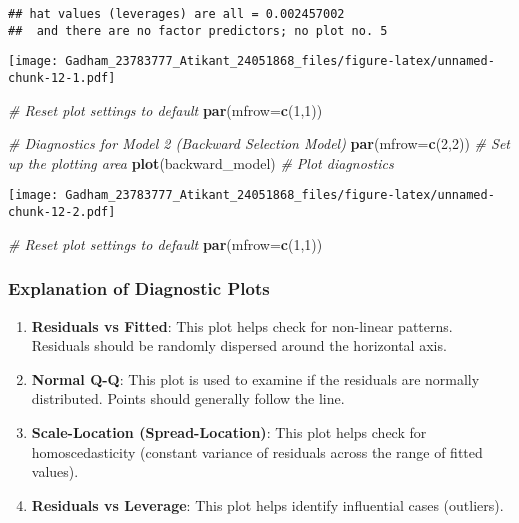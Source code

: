 \documentclass[
]{article}
\newenvironment{Shaded}{\begin{snugshade}}{\end{snugshade}}
\newcommand{\AttributeTok}[1]{\textcolor[rgb]{0.13,0.29,0.53}{#1}}
\newcommand{\CommentTok}[1]{\textcolor[rgb]{0.56,0.35,0.01}{\textit{#1}}}
\newcommand{\DecValTok}[1]{\textcolor[rgb]{0.00,0.00,0.81}{#1}}
\newcommand{\FunctionTok}[1]{\textcolor[rgb]{0.13,0.29,0.53}{\textbf{#1}}}
\newcommand{\NormalTok}[1]{#1}
\providecommand{\tightlist}{%
  \setlength{\itemsep}{0pt}\setlength{\parskip}{0pt}}
\begin{document}
\begin{verbatim}
## hat values (leverages) are all = 0.002457002
##  and there are no factor predictors; no plot no. 5
\end{verbatim}

\texttt{[image: Gadham\_23783777\_Atikant\_24051868\_files/figure-latex/unnamed-chunk-12-1.pdf]}

\begin{Shaded}
\begin{Highlighting}[]
\CommentTok{\# Reset plot settings to default}
\FunctionTok{par}\NormalTok{(}\AttributeTok{mfrow=}\FunctionTok{c}\NormalTok{(}\DecValTok{1}\NormalTok{,}\DecValTok{1}\NormalTok{))}

\CommentTok{\# Diagnostics for Model 2 (Backward Selection Model)}
\FunctionTok{par}\NormalTok{(}\AttributeTok{mfrow=}\FunctionTok{c}\NormalTok{(}\DecValTok{2}\NormalTok{,}\DecValTok{2}\NormalTok{))  }\CommentTok{\# Set up the plotting area}
\FunctionTok{plot}\NormalTok{(backward\_model)  }\CommentTok{\# Plot diagnostics}
\end{Highlighting}
\end{Shaded}

\texttt{[image: Gadham\_23783777\_Atikant\_24051868\_files/figure-latex/unnamed-chunk-12-2.pdf]}

\begin{Shaded}
\begin{Highlighting}[]
\CommentTok{\# Reset plot settings to default}
\FunctionTok{par}\NormalTok{(}\AttributeTok{mfrow=}\FunctionTok{c}\NormalTok{(}\DecValTok{1}\NormalTok{,}\DecValTok{1}\NormalTok{))}
\end{Highlighting}
\end{Shaded}

\hypertarget{explanation-of-diagnostic-plots}{%
\subsubsection{Explanation of Diagnostic
Plots}\label{explanation-of-diagnostic-plots}}

\begin{enumerate}
\def\labelenumi{\arabic{enumi}.}
\tightlist
\item
  \textbf{Residuals vs Fitted}: This plot helps check for non-linear
  patterns. Residuals should be randomly dispersed around the horizontal
  axis.
\item
  \textbf{Normal Q-Q}: This plot is used to examine if the residuals are
  normally distributed. Points should generally follow the line.
\item
  \textbf{Scale-Location (Spread-Location)}: This plot helps check for
  homoscedasticity (constant variance of residuals across the range of
  fitted values).
\item
  \textbf{Residuals vs Leverage}: This plot helps identify influential
  cases (outliers).
\end{enumerate}
\end{document}
